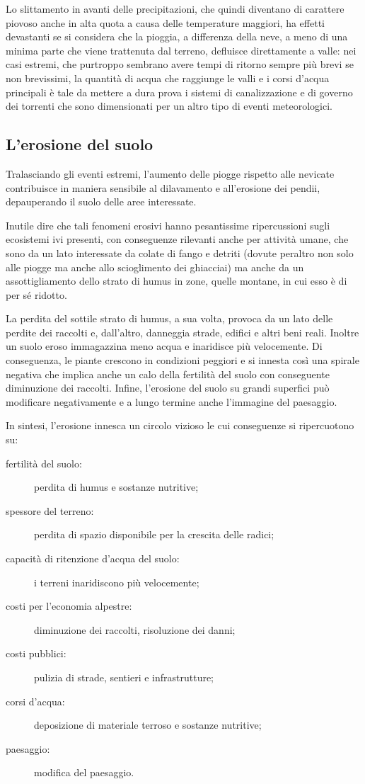 \documentclass[14pt,a4paper]{article}
\begin{document}
	Lo slittamento in avanti delle precipitazioni, che quindi diventano di carattere piovoso anche in alta quota a causa delle temperature maggiori, ha effetti devastanti se si considera che la pioggia, a differenza della neve, a meno di una minima parte che viene trattenuta dal terreno, defluisce direttamente a valle: nei casi estremi, che purtroppo sembrano avere tempi di ritorno sempre più brevi se non brevissimi, la quantità di acqua che raggiunge le valli e i corsi d'acqua principali è tale da mettere a dura prova i sistemi di canalizzazione e di governo dei torrenti che sono dimensionati per un altro tipo di eventi meteorologici.
	
	\subsection{L'erosione del suolo}
	Tralasciando gli eventi estremi, l'aumento delle piogge rispetto alle nevicate contribuisce in maniera sensibile al dilavamento e all'erosione dei pendii, depauperando il suolo delle aree interessate.
	
	Inutile dire che tali fenomeni erosivi hanno pesantissime ripercussioni sugli ecosistemi ivi presenti, con conseguenze rilevanti anche per attività umane, che sono da un lato interessate da colate di fango e detriti (dovute peraltro non solo alle piogge ma anche allo scioglimento dei ghiacciai) ma anche da un assottigliamento dello strato di humus in zone, quelle montane, in cui esso è di per sé ridotto.
	
	La perdita del sottile strato di humus, a sua volta, provoca da un lato delle perdite dei raccolti e, dall'altro, danneggia strade, edifici e altri beni reali. Inoltre un suolo eroso immagazzina meno acqua e inaridisce più velocemente. Di conseguenza, le piante crescono in condizioni peggiori e si innesta così una spirale negativa che implica anche un calo della fertilità del suolo con conseguente diminuzione dei raccolti. Infine, l'erosione del suolo su grandi superfici può modificare negativamente e a lungo termine anche l'immagine del paesaggio.
	 	
	In sintesi, l'erosione innesca un circolo vizioso le cui conseguenze si ripercuotono su:
	
	\begin{description}
		\item[fertilità del suolo:]
		perdita di humus e sostanze nutritive;
		\item[spessore del terreno:]
		perdita di spazio disponibile per la crescita delle radici;
		\item[capacità di ritenzione d'acqua del suolo:]
		i terreni inaridiscono più velocemente;
		\item[costi per l'economia alpestre:]
		diminuzione dei raccolti, risoluzione dei danni;
		\item[costi pubblici:]
		pulizia di strade, sentieri e infrastrutture;
		\item[corsi d'acqua:]
		deposizione di materiale terroso e sostanze nutritive;
		\item[paesaggio:]
		modifica del paesaggio.
	\end{description}
		
\end{document}
